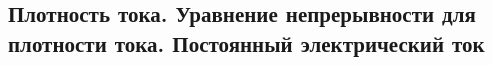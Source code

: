 \subsection{Плотность тока. Уравнение непрерывности для плотности тока. Постоянный электрический ток}